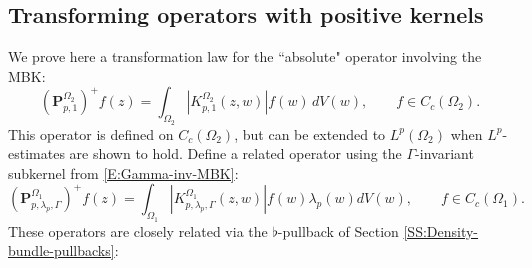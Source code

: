 \documentclass[letterpaper,11pt,reqno]{amsart}
\theoremstyle{plain}
\theoremstyle{definition}
\theoremstyle{remark}
\theoremstyle{remark}
\numberwithin{equation}{section}
\newcommand{\abs}[1]{\left\vert#1\right\vert}
\begin{document}
\subsection{Transforming operators with positive kernels}\label{SS:AMBO-trans-law}

We prove here a transformation law for the ``absolute" operator involving the MBK:
\begin{equation}\label{E:unweighted-AMBO}
(\bm{P}^{\Omega_2}_{p,1})^+ f(z) = \int_{\Omega_2}\abs{K^{\Omega_2}_{p,1}(z,w)}  f(w) \,dV(w), \qquad f\in C_c(\Omega_2).  
\end{equation}
This operator is defined on $C_c(\Omega_2)$, but can be extended to $L^p(\Omega_2)$ when $L^p$-estimates are shown to hold.
Define a related operator using the $\Gamma$-invariant subkernel from \eqref{E:Gamma-inv-MBK}:
\begin{equation}\label{E:invariant-AMBO}
    (\bm{P}^{\Omega_1}_{p,\lambda_p,\Gamma})^+ f(z) = \int_{\Omega_1}  \abs{K^{\Omega_1}_{p,\lambda_p,\Gamma}(z,w)}f(w) \lambda_p(w)dV(w), \qquad f \in C_c(\Omega_1).
\end{equation}
These operators are closely related via the $\flat$-pullback of Section \ref{SS:Density-bundle-pullbacks}:
\end{document}
